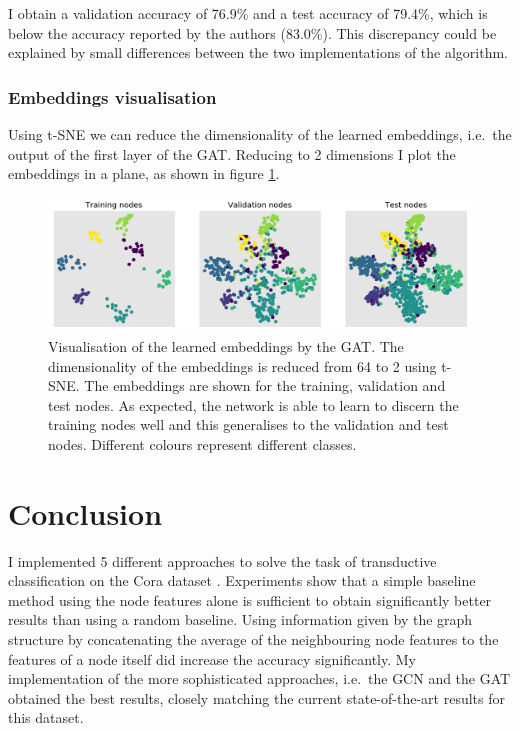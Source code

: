 \documentclass[12pt]{article}
\theoremstyle{definition}
\begin{document}
I obtain a validation accuracy of 76.9\% and a test accuracy of 79.4\%, which is below the accuracy reported by the authors (83.0\%). This discrepancy could be explained by small differences between the two implementations of the algorithm. 

\subsubsection{Embeddings visualisation}
Using t-SNE we can reduce the dimensionality of the learned embeddings, i.e.\ the output of the first layer of the GAT. Reducing to 2 dimensions I plot the embeddings in a plane, as shown in figure \ref{fig/gat_tsne}.
\begin{figure}[h]
	\includegraphics[width=1.0\textwidth]{gat/visualisation_tsne}
	\centering
	\caption{Visualisation of the learned embeddings by the GAT. The dimensionality of the embeddings is reduced from 64 to 2 using t-SNE. The embeddings are shown for the training, validation and test nodes. As expected, the network is able to learn to discern the training nodes well and this generalises to the validation and test nodes. Different colours represent different classes.}
	\label{fig/gat_tsne}
\end{figure}

\section{Conclusion}
	I implemented 5 different approaches to solve the task of transductive classification on the Cora dataset \cite{cora}. Experiments show that a simple baseline method using the node features alone is sufficient to obtain significantly better results than using a random baseline. Using information given by the graph structure by concatenating the average of the neighbouring node features to the features of a node itself did increase the accuracy significantly. My implementation of the more sophisticated approaches, i.e.\ the GCN and the GAT obtained the best results, closely matching the current state-of-the-art results for this dataset.	


\end{document}
